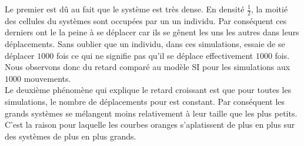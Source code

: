 Le premier est dû au fait que le système est très dense. En densité $\frac{1}{2}$, la moitié des cellules du systèmes sont occupées par un un individu. Par conséquent ces derniers ont le la peine à se déplacer car ils se gênent les uns les autres dans leurs déplacements. Sans oublier que un individu, dans ces simulations, essaie de se déplacer $1000$ fois ce qui ne signifie pas qu'il se déplace effectivement $1000$ fois. Nous observons donc du retard comparé au modèle SI pour les simulations aux $1000$ mouvements. \\

Le deuxième phénomène qui explique le retard croissant est que pour toutes les simulations, le nombre de déplacements pour est constant. Par conséquent les grands systèmes se mélangent moins relativement à leur taille que les plus petits. C'est la raison pour laquelle les courbes oranges s'aplatissent de plus en plus sur des systèmes de plus en plus grands.\\

\newpage

